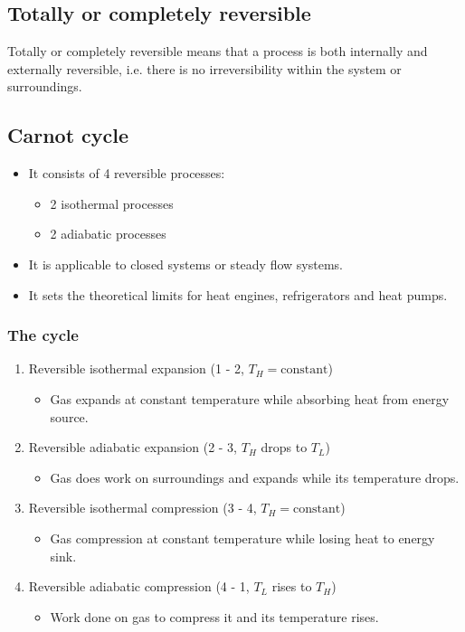 \documentclass[11pt]{article}
\begin{document}
\subsection{Totally or completely reversible}
\label{sec:org50d4c47}
Totally or completely reversible means that a process is both internally and externally reversible, i.e. there is no irreversibility within the system or surroundings.

\subsection{Carnot cycle}
\label{sec:org012beb4}
\begin{itemize}
\item It consists of 4 reversible processes:
\begin{itemize}
\item 2 isothermal processes
\item 2 adiabatic processes
\end{itemize}
\item It is applicable to closed systems or steady flow systems.
\item It sets the theoretical limits for heat engines, refrigerators and heat pumps.
\end{itemize}

 \newpage

\subsubsection{The cycle}
\label{sec:org5616d23}
\begin{enumerate}
\item Reversible isothermal expansion (1 - 2, \(T_H = \text{constant}\))
\begin{itemize}
\item Gas expands at constant temperature while absorbing heat from energy source.
\end{itemize}
\item Reversible adiabatic expansion (2 - 3, \(T_H\) drops to \(T_L\))
\begin{itemize}
\item Gas does work on surroundings and expands while its temperature drops.
\end{itemize}
\item Reversible isothermal compression (3 - 4, \(T_H = \text{constant}\))
\begin{itemize}
\item Gas compression at constant temperature while losing heat to energy sink.
\end{itemize}
\item Reversible adiabatic compression (4 - 1, \(T_L\) rises to \(T_H\))
\begin{itemize}
\item Work done on gas to compress it and its temperature rises.
\end{itemize}
\end{enumerate}
\end{document}
